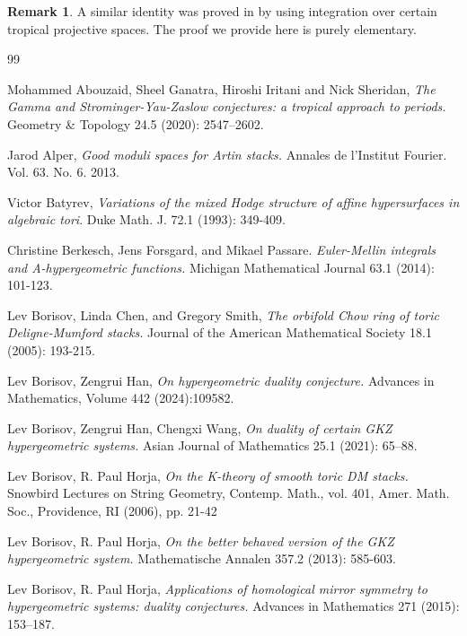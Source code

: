 \documentclass[11pt,reqno]{amsart}
\theoremstyle{definition}
\newtheorem{remark}[theorem]{Remark}
\numberwithin{equation}{section}
\begin{document}
\smallskip


\begin{remark}
	A similar identity was proved in \cite{AGIS} by using integration over certain tropical projective spaces. The proof we provide here is purely elementary.
\end{remark}


\begin{thebibliography}{99}

Mohammed Abouzaid, Sheel Ganatra, Hiroshi Iritani and Nick Sheridan, \emph{The Gamma and Strominger-Yau-Zaslow conjectures: a tropical approach to periods.} Geometry \& Topology 24.5 (2020): 2547--2602.

 Jarod Alper, \emph{Good moduli spaces for Artin stacks.} Annales de l'Institut Fourier. Vol. 63. No. 6. 2013.

 Victor Batyrev, \emph{Variations of the mixed Hodge structure of affine hypersurfaces in algebraic tori}. Duke Math. J. 72.1 (1993): 349-409.
 

 Christine Berkesch, Jens Forsgard, and Mikael Passare. \emph{Euler-Mellin integrals and A-hypergeometric functions.} Michigan Mathematical Journal 63.1 (2014): 101-123.

Lev Borisov, Linda Chen, and Gregory Smith, \emph{The orbifold Chow ring of toric Deligne-Mumford stacks.} Journal of the American Mathematical Society 18.1 (2005): 193-215.

 Lev Borisov, Zengrui Han, \emph{On hypergeometric duality conjecture.} Advances in Mathematics, Volume 442 (2024):109582.
 
Lev Borisov, Zengrui Han, Chengxi Wang, \emph{On duality of certain GKZ hypergeometric systems.} Asian Journal of Mathematics 25.1 (2021): 65--88.

 Lev Borisov, R. Paul Horja, \emph{On the K-theory of smooth toric DM stacks.} Snowbird Lectures on String Geometry, Contemp. Math., vol. 401, Amer. Math. Soc., Providence, RI (2006), pp. 21-42
 
 Lev Borisov, R. Paul Horja, \emph{On the better behaved version of the GKZ hypergeometric system.} Mathematische Annalen 357.2 (2013): 585-603.

 Lev Borisov, R. Paul Horja, \emph{Applications of homological mirror symmetry to hypergeometric systems: duality conjectures.} Advances in Mathematics 271 (2015): 153--187.
 

\end{thebibliography}
\end{document}
